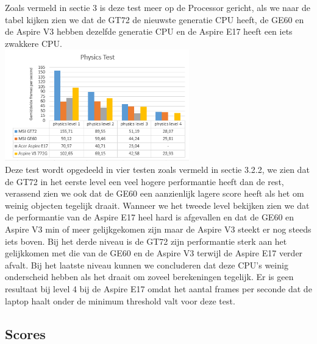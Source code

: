 Zoals vermeld in sectie 3 is deze test meer op de Processor gericht, als we naar de tabel kijken zien we dat de GT72 de nieuwste generatie CPU heeft, de GE60 en de Aspire V3 hebben dezelfde generatie CPU en de Aspire E17 heeft een iets zwakkere CPU.\\
\includegraphics[width=8cm]{physics}\\
Deze test wordt opgedeeld in vier testen zoals vermeld in sectie 3.2.2, we zien dat de GT72 in het eerste level een veel hogere performantie heeft dan de rest, verassend zien we ook dat de GE60 een aanzienlijk lagere score heeft als het om weinig objecten tegelijk draait.
Wanneer we het tweede level bekijken zien we dat de performantie van de Aspire E17 heel hard is afgevallen en dat de GE60 en Aspire V3 min of meer gelijkgekomen zijn maar de Aspire V3 steekt er nog steeds iets boven.
Bij het derde niveau is de GT72 zijn performantie sterk aan het gelijkkomen met die van de GE60 en de Aspire V3 terwijl de Aspire E17 verder afvalt.
Bij het laatste niveau kunnen we concluderen dat deze CPU's weinig onderscheid hebben als het draait om zoveel berekeningen tegelijk. Er is geen resultaat bij level 4 bij de Aspire E17 omdat het aantal frames per seconde dat de laptop haalt onder de minimum threshold valt voor deze test.

\subsection{Scores}
